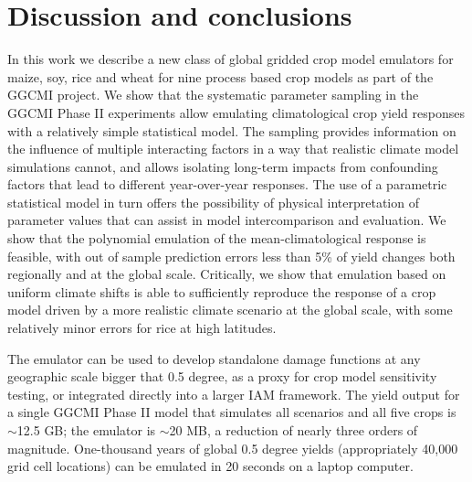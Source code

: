 \documentclass[gmd, manuscript]{copernicus} %
\begin{document}
\section{Discussion and conclusions} 
\label{S:6}
In this work we describe a new class of global gridded crop model emulators for maize, soy, rice and wheat for nine process based crop models as part of the GGCMI project.
We show that the systematic parameter sampling in the GGCMI Phase II experiments allow emulating climatological crop yield responses with a relatively simple statistical model.
The sampling provides information on the influence of multiple interacting factors in a way that realistic climate model simulations cannot, and allows isolating long-term impacts from confounding factors that lead to different year-over-year responses. 
The use of a parametric statistical model in turn offers the possibility of physical interpretation of parameter values that can assist in model intercomparison and evaluation. 
We show that the polynomial emulation of the mean-climatological response is feasible, with out of sample prediction errors less than 5\% of yield changes both regionally and at the global scale.
Critically, we show that emulation based on uniform climate shifts is able to sufficiently reproduce the response of a crop model driven by a more realistic climate scenario at the global scale, with some relatively minor errors for rice at high latitudes.

The emulator can be used to develop standalone damage functions at any geographic scale bigger that 0.5 degree, as a proxy for crop model sensitivity testing, or integrated directly into a larger IAM framework. 
The yield output for a single GGCMI Phase II model that simulates all scenarios and all five crops is $\sim$12.5 GB; the emulator is $\sim$20 MB, a reduction of nearly three orders of magnitude.
One-thousand years of global 0.5 degree yields (appropriately 40,000 grid cell locations) can be emulated in 20 seconds on a laptop computer. 
\end{document}
